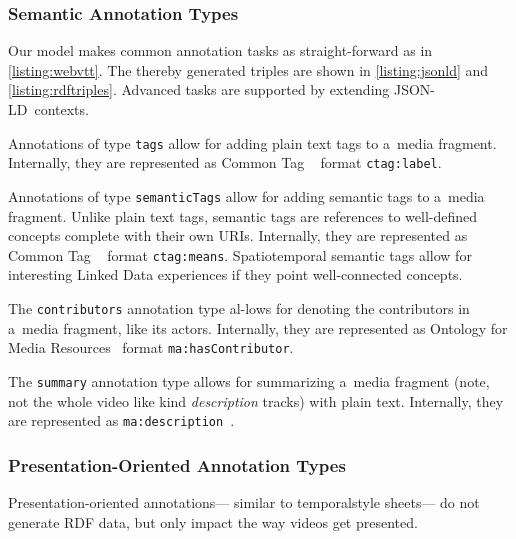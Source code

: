 \documentclass{sig-alternate}
\def\JSONLD{\mbox{JSON-LD}}
\begin{document}
\subsubsection{Semantic Annotation Types}

Our model makes common annotation tasks as
straight-forward as in \autoref{listing:webvtt}.
The thereby generated triples are shown in
\autoref{listing:jsonld} and \autoref{listing:rdftriples}.
Advanced tasks are supported by extending \JSONLD\ contexts.\\

\begin{description}[leftmargin=*]
  \item[Plain Text Tags] Annotations of type
  \texttt{tags} allow for add\-ing plain text tags
  to a~media fragment.
  Internally, they are represented as Common Tag%
  ~\cite{commontag2009spec} format \texttt{ctag:label}.

  \item[Semantic Tags] Annotations of type
  \texttt{semanticTags} allow for adding semantic tags
  to a~media fragment.
  Unlike plain text tags, semantic tags are references to
  well-defined concepts complete with their own URIs.
  Internally, they are represented as Common Tag%
  ~\cite{commontag2009spec} format \texttt{ctag:means}.
  Spatiotemporal semantic tags allow for
  interesting Linked Data experiences
  if they point well-connected concepts.

  \item[Contributors] The \texttt{contributors} annotation type
  al-\linebreak lows for denoting the contributors in a~media fragment, like its actors.
  Internally, they are represented as
  Ontology for Media Resources~\cite{lee2012mediaontology}
  format \texttt{ma:hasContributor}.

  \item[Summary] The \texttt{summary} annotation type
  allows for summarizing a~media fragment
  (note, not the whole video like kind \emph{description} tracks)
  with plain text.
  Internally, they are represented as  
  \texttt{ma:description}~\cite{lee2012mediaontology}.
\end{description}

\subsubsection{Presentation-Oriented Annotation Types}

Presentation-oriented annotations---%
similar to temporal\linebreak style sheets---%
do not generate RDF data,
but only impact the way videos get presented.\\
\end{document}
